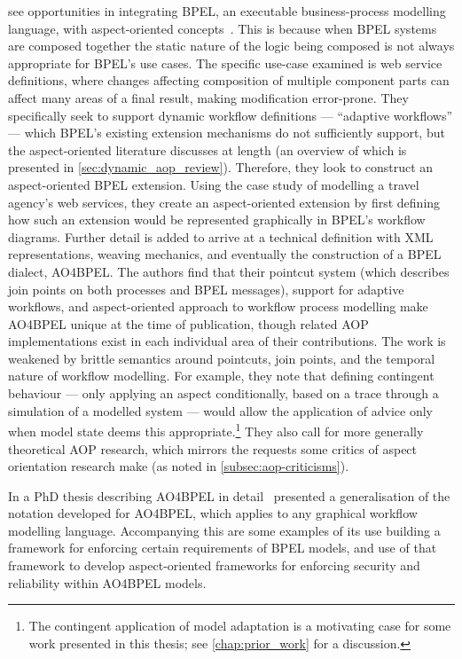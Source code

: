 \citeauthor{charfi2007ao4bpel} see opportunities in integrating BPEL, an
executable business-process modelling language, with aspect-oriented
concepts~\cite{charfi2007ao4bpel}. This is because when BPEL systems are
composed together the static nature of the logic being composed is not always
appropriate for BPEL's use cases. The specific use-case examined is web service
definitions, where changes affecting composition of multiple component parts can
affect many areas of a final result, making modification error-prone. They
specifically seek to support dynamic workflow definitions --- ``adaptive
workflows'' --- which BPEL's existing extension mechanisms do not sufficiently
support, but the aspect-oriented literature discusses at length (an overview of
which is presented in \cref{sec:dynamic_aop_review}). Therefore, they look to
construct an aspect-oriented BPEL extension. Using the case study of modelling a
travel agency's web services, they create an aspect-oriented extension by first
defining how such an extension would be represented graphically in BPEL's
workflow diagrams. Further detail is added to arrive at a technical definition
with XML representations, weaving mechanics, and eventually the construction of
a BPEL dialect, AO4BPEL. The authors find that their pointcut system (which
describes join points on both processes and BPEL messages), support for adaptive
workflows, and aspect-oriented approach to workflow process modelling make
AO4BPEL unique at the time of publication, though related AOP implementations
exist in each individual area of their contributions. The work is weakened by
brittle semantics around pointcuts, join points, and the temporal nature of
workflow modelling. For example, they note that defining contingent behaviour
--- only applying an aspect conditionally, based on a trace through a simulation
of a modelled system --- would allow the application of advice only when model
state deems this appropriate.\footnote{The contingent application of model
adaptation is a motivating case for some work presented in this thesis; see
\cref{chap:prior_work} for a discussion.} They also call for more generally
theoretical AOP research, which mirrors the requests some critics of aspect
orientation research make (as noted in \cref{subsec:aop-criticisms}). 

In a PhD thesis describing AO4BPEL in detail~\cite{Charfi2006AspectOrientedWL}
\citeauthor{Charfi2006AspectOrientedWL} presented a generalisation of the
notation developed for AO4BPEL, which applies to any graphical workflow
modelling language. Accompanying this are some examples of its use building a
framework for enforcing certain requirements of BPEL models, and use of that
framework to develop aspect-oriented frameworks for enforcing security and
reliability within AO4BPEL models.

